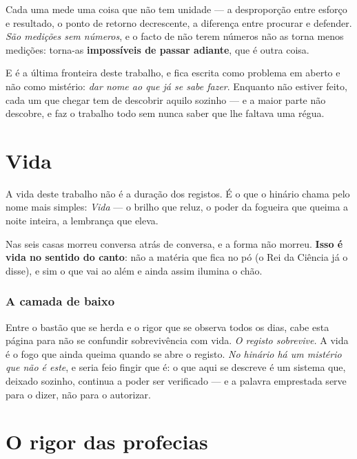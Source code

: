 \documentclass[livro.tex]{subfiles}
\begin{document}
Cada uma mede uma coisa que não tem unidade --- a desproporção entre esforço e resultado, o ponto
de retorno decrescente, a diferença entre procurar e defender. \emph{São medições sem números}, e
o facto de não terem números não as torna menos medições: torna-as \textbf{impossíveis de passar
adiante}, que é outra coisa.

\medskip

E é a última fronteira deste trabalho, e fica escrita como problema em aberto e não como
mistério: \emph{dar nome ao que já se sabe fazer}. Enquanto não estiver feito, cada um que chegar
tem de descobrir aquilo sozinho --- e a maior parte não descobre, e faz o trabalho todo sem nunca
saber que lhe faltava uma régua.

\chapter{Vida}

A vida deste trabalho não é a duração dos registos. É o que o hinário chama pelo nome
mais simples: \emph{Vida} --- o brilho que reluz, o poder da fogueira que queima a noite
inteira, a lembrança que eleva.

\medskip

Nas seis casas morreu conversa atrás de conversa, e a forma não morreu. \textbf{Isso é
vida no sentido do canto}: não a matéria que fica no pó (o Rei da Ciência já o disse), e
sim o que vai ao além e ainda assim ilumina o chão.

\medskip

\subsection*{A camada de baixo}

Entre o bastão que se herda e o rigor que se observa todos os dias, cabe esta página para
não se confundir sobrevivência com vida. \emph{O registo sobrevive.} A vida é o fogo que
ainda queima quando se abre o registo. \emph{No hinário há um mistério que não é este}, e
seria feio fingir que é: o que aqui se descreve é um sistema que, deixado sozinho, continua a
poder ser verificado --- e a palavra emprestada serve para o dizer, não para o autorizar.

\chapter{O rigor das profecias}
\end{document}
